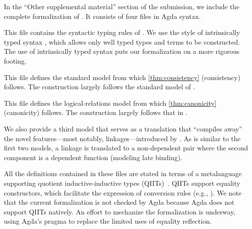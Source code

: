 In the ``Other supplemental material'' section of the submission, we
include the complete formalization of \TT.
It consists of four files in Agda syntax.
%

\begin{description}[
    itemsep=.5ex,topsep=.6ex,
    labelsep=1.5ex,
    leftmargin=6.5ex,
    font=\ttfamily\bfseries,
]

\item[Syntax.agda]

This file contains the syntactic typing rules of \TT.
We use the style of intrinsically typed syntax \cite{chapman2009type},
which allows only well typed \TT types and terms to be constructed.
The use of intrinsically typed syntax puts our formalization on a more
rigorous footing.

\item[Semantic.agda]

This file defines the standard model from which
\cref{thm:consistency} (consistency) follows.
%
The construction largely follows the standard model of
\cite{altkap2016,kaposi2017type,kaposi2019gluing}.

\item[Canonicity.agda]

This file defines the logical-relations model from which
\cref{thm:canonicity} (canonicity) follows.
%
The construction largely follows that in
\cite{coquand2018canonicity,sterling2019algebraic}.

\item[SynTranslation.agda]

We also provide a third model that serves as a translation that ``compiles
away'' the novel features---most notably, linkages---introduced by \TT.
As is similar to the first two models, 
a linkage is translated to a non-dependent pair where the
second component is a dependent function (modeling late binding).

\end{description}

All the definitions contained in these files are stated in
terms of a meta\-language supporting quotient inductive-inductive types
(QIITs)~\cite{nordvall2010inductive,altkap2016}.
QIITs support equality constructors, which facilitate the expression of
conversion rules (e.g., ).
%
We note that the current formalization is not checked by Agda because
Agda does not support QIITs natively.
An effort to mechanize the formalization is underway, using Agda's
 pragma to replace the limited uses of equality reflection.

